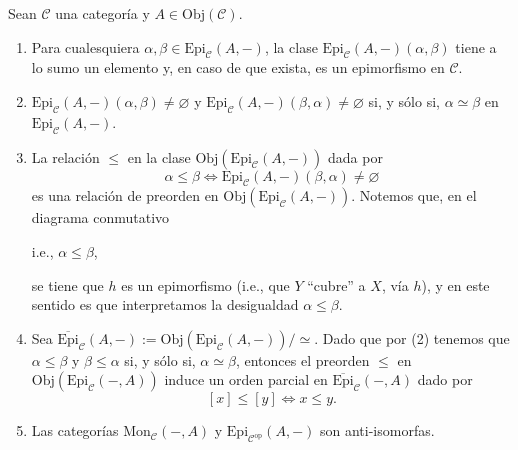 \documentclass[tesis]{subfiles}
\begin{document}
\begin{Obs}\label{Observaciones sobre la categoría de objetos cociente}
    
    Sean $\mathscr{C}$ una categoría y $A\in\text{Obj}(\mathscr{C})$.

    \begin{enumerate}[label=(\arabic*)]

        \item Para cualesquiera $\alpha,\beta\in\text{Epi}_\mathscr{C}(A,-)$, la clase $\text{Epi}_\mathscr{C}(A,-)(\alpha,\beta)$ tiene a lo sumo un elemento y, en caso de que exista, es un epimorfismo en $\mathscr{C}$.

        \item $\text{Epi}_\mathscr{C}(A,-)(\alpha,\beta)\neq\varnothing$ y $\text{Epi}_\mathscr{C}(A,-)(\beta,\alpha)\neq\varnothing$ si, y sólo si, $\alpha\simeq\beta$ en $\text{Epi}_\mathscr{C}(A,-)$.

        \item La relación $\leq$ en la clase $\text{Obj}(\text{Epi}_\mathscr{C}(A,-))$ dada por
            \[
                \alpha\leq\beta \iff \text{Epi}_\mathscr{C}(A,-)(\beta,\alpha)\neq\varnothing
            \] 
            es una relación de preorden en $\text{Obj}(\text{Epi}_\mathscr{C}(A,-))$. Notemos que, en el diagrama conmutativo
            \begin{center}
                \hspace{3mm} i.e., $\alpha\le\beta$,
            \end{center}
            se tiene que $h$ es un epimorfismo (i.e., que $Y$ ``cubre'' a $X$, vía $h$), y en este sentido es que interpretamos la desigualdad $\alpha\le\beta$.

        \item Sea $\overline{\text{Epi}}_\mathscr{C}(A,-):=\text{Obj}(\text{Epi}_\mathscr{C}(A,-))/\simeq$. Dado que por (2) tenemos que $\alpha\leq\beta$ y $\beta\leq\alpha$ si, y sólo si, $\alpha\simeq\beta$, entonces el preorden $\leq$ en $\text{Obj}(\text{Epi}_\mathscr{C}(-,A))$ induce un orden parcial en $\overline{\text{Epi}}_\mathscr{C}(-,A)$ dado por
            \[
                [x]\leq[y] \iff x\leq y.
            \] 

        \item Las categorías $\text{Mon}_\mathscr{C}(-,A)$ y $\text{Epi}_{\mathscr{C}^\text{op}}(A,-)$ son anti-isomorfas.

    \end{enumerate}
\end{Obs}
\end{document}
